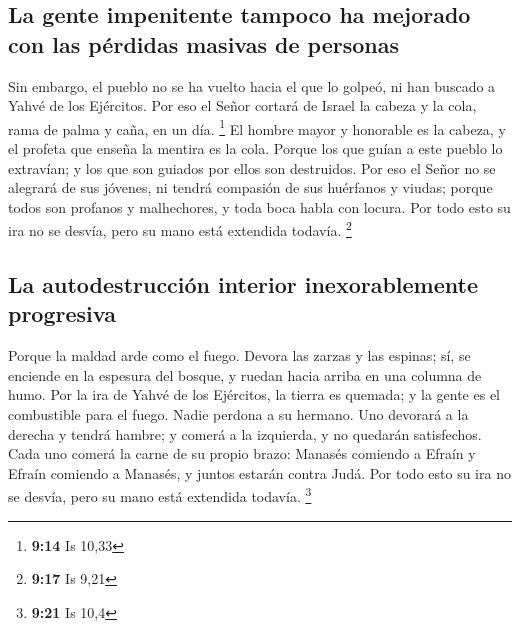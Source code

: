 \begin{paracol}{2}
\hypertarget{la-gente-impenitente-tampoco-ha-mejorado-con-las-puxe9rdidas-masivas-de-personas}{%
\subsection{La gente impenitente tampoco ha mejorado con las pérdidas
masivas de
personas}\label{la-gente-impenitente-tampoco-ha-mejorado-con-las-puxe9rdidas-masivas-de-personas}}

 Sin embargo, el pueblo no se ha vuelto hacia el que lo
golpeó, ni han buscado a Yahvé de los Ejércitos.  Por eso
el Señor cortará de Israel la cabeza y la cola, rama de palma y caña, en
un día. \footnote{\textbf{9:14} Is 10,33}  El hombre
mayor y honorable es la cabeza, y el profeta que enseña la mentira es la
cola.  Porque los que guían a este pueblo lo extravían; y
los que son guiados por ellos son destruidos.  Por eso el
Señor no se alegrará de sus jóvenes, ni tendrá compasión de sus
huérfanos y viudas; porque todos son profanos y malhechores, y toda boca
habla con locura. Por todo esto su ira no se desvía, pero su mano está
extendida todavía. \footnote{\textbf{9:17} Is 9,21}

\hypertarget{la-autodestrucciuxf3n-interior-inexorablemente-progresiva}{%
\subsection{La autodestrucción interior inexorablemente
progresiva}\label{la-autodestrucciuxf3n-interior-inexorablemente-progresiva}}

 Porque la maldad arde como el fuego. Devora las zarzas y
las espinas; sí, se enciende en la espesura del bosque, y ruedan hacia
arriba en una columna de humo.  Por la ira de Yahvé de
los Ejércitos, la tierra es quemada; y la gente es el combustible para
el fuego. Nadie perdona a su hermano.  Uno devorará a la
derecha y tendrá hambre; y comerá a la izquierda, y no quedarán
satisfechos. Cada uno comerá la carne de su propio brazo:
 Manasés comiendo a Efraín y Efraín comiendo a Manasés, y
juntos estarán contra Judá. Por todo esto su ira no se desvía, pero su
mano está extendida todavía. \footnote{\textbf{9:21} Is 10,4}

\switchcolumn
\begin{otherlanguage}{english}

\hypertarget{prophecy-of-the-establishment-of-the-kingdom-of-god-by-the-promised-descendant-of-david}{%
}
\end{otherlanguage}
\end{paracol}
